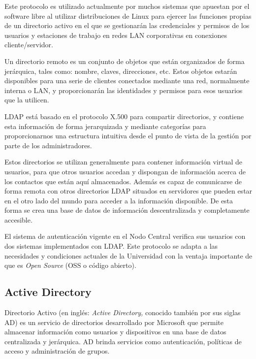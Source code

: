 Este protocolo es utilizado actualmente por muchos sistemas que apuestan por el software libre al utilizar distribuciones de Linux para ejercer las funciones propias de un directorio activo en el que se gestionarán las credenciales y permisos de los usuarios y estaciones de trabajo en redes LAN corporativas en conexiones cliente/servidor.

Un directorio remoto es un conjunto de objetos que están organizados de forma jerárquica, tales como: nombre, claves, direcciones, etc. Estos objetos estarán disponibles para una serie de clientes conectados mediante una red, normalmente interna o LAN, y proporcionarán las identidades y permisos para esos usuarios que la utilicen.

LDAP está basado en el protocolo X.500 para compartir directorios, y contiene esta información de forma jerarquizada y mediante categorías para proporcionarnos una estructura intuitiva desde el punto de vista de la gestión por parte de los administradores.

Estos directorios se utilizan generalmente para contener información virtual de usuarios, para que otros usuarios accedan y dispongan de información acerca de los contactos que están aquí almacenados. Además es capaz de comunicarse de forma remota con otros directorios LDAP situados en servidores que pueden estar en el otro lado del mundo para acceder a la información disponible. De esta forma se crea una base de datos de información descentralizada y completamente accesible.
 
El sistema de autenticación vigente en el Nodo Central verifica sus usuarios con dos sistemas implementados con LDAP. Este protocolo se adapta a las necesidades y condiciones actuales de la Universidad con la ventaja importante de que es \textit{Open Source} (OSS o código abierto).


\subsection*{Active Directory}
Directorio Activo (en inglés: \textit{Active Directory,} conocido también por sus siglas AD) es un servicio de directorios desarrollado por Microsoft que permite almacenar información como usuarios y dispositivos en una base de datos centralizada y jerárquica. AD brinda servicios como autenticación, políticas de acceso y administración de grupos.

